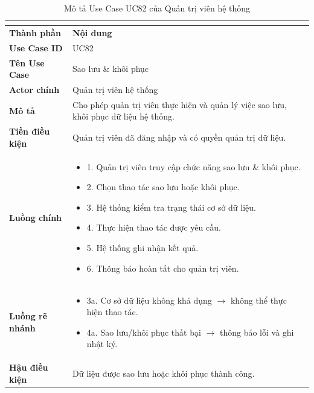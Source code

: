 \begin{longtable}{|C{3cm}|L{11cm}|}
\caption{Mô tả Use Case UC82 của Quản trị viên hệ thống}\\
\label{tab:mo-ta-uc82-quan-tri-vien}\\
\hline
\textbf{Thành phần} & \textbf{Nội dung} \\
\hline
\textbf{Use Case ID} & UC82 \\
\hline
\textbf{Tên Use Case} & Sao lưu \& khôi phục \\
\hline
\textbf{Actor chính} & Quản trị viên hệ thống \\
\hline
\textbf{Mô tả} &
Cho phép quản trị viên thực hiện và quản lý việc sao lưu, khôi phục dữ liệu hệ thống.
\\
\hline
\textbf{Tiền điều kiện} &
Quản trị viên đã đăng nhập và có quyền quản trị dữ liệu.
\\
\hline
\textbf{Luồng chính} &
\begin{itemize}[leftmargin=*,topsep=2pt,itemsep=2pt]
    \item 1. Quản trị viên truy cập chức năng sao lưu \& khôi phục.
    \item 2. Chọn thao tác sao lưu hoặc khôi phục.
    \item 3. Hệ thống kiểm tra trạng thái cơ sở dữ liệu.
    \item 4. Thực hiện thao tác được yêu cầu.
    \item 5. Hệ thống ghi nhận kết quả.
    \item 6. Thông báo hoàn tất cho quản trị viên.
\end{itemize}
\\
\hline
\textbf{Luồng rẽ nhánh} &
\begin{itemize}[leftmargin=*,topsep=2pt,itemsep=2pt]
    \item 3a. Cơ sở dữ liệu không khả dụng $\rightarrow$ không thể thực hiện thao tác.
    \item 4a. Sao lưu/khôi phục thất bại $\rightarrow$ thông báo lỗi và ghi nhật ký.
\end{itemize}
\\
\hline
\textbf{Hậu điều kiện} &
Dữ liệu được sao lưu hoặc khôi phục thành công.
\\
\hline
\end{longtable}

